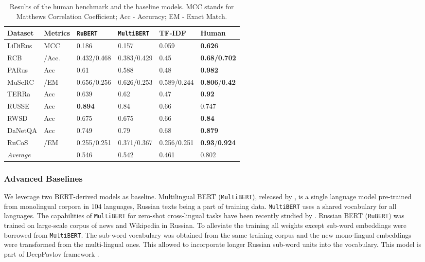 \documentclass[11pt,a4paper]{article}
\begin{document}
\begin{table*}[!htbp]
\centering
\begin{tabular}{|l|l|l|l|l|l|}
\hline
\textbf{Dataset}   & \textbf{Metrics} & \texttt{RuBERT}      & \texttt{MultiBERT}   & TF-IDF & Human                           \\  \hline
LiDiRus & MCC     & 0.186       & 0.157       & 0.059   & \textbf{0.626}                           \\ 
RCB     & /Acc. & 0.432/0.468 & 0.383/0.429 & 0.45   & \textbf{0.68/0.702  }                    \\ 
PARus   & Acc     & 0.61        & 0.588       & 0.48   & \textbf{0.982}                           \\ 
MuSeRC  & /EM  & 0.656/0.256 & 0.626/0.253 & 0.589/0.244      & \textbf{0.806}/\textbf{0.42 }                     \\ 
TERRa   & Acc     & 0.639       & 0.62        & 0.47   & \textbf{0.92}                            \\ 
RUSSE   & Acc     & \textbf{0.894}       & 0.84        & 0.66   & 0.747                           \\ 
RWSD    & Acc     & 0.675       & 0.675       & 0.66   & \textbf{0.84 }                           \\ 
DaNetQA & Acc     & 0.749       & 0.79        & 0.68   & \textbf{0.879}                           \\ 
RuCoS   & /EM   & 0.255/0.251 & 0.371/0.367 & 0.256/0.251   & \textbf{0.93}/\textbf{0.924} \\ \hline
\textit{Average}   &         & 0.546           & 0.542       & 0.461      & 0.802                               \\ \hline
\end{tabular}
\caption{Results of the human benchmark and the baseline models. MCC stands for Matthews Correlation Coefficient; Acc - Accuracy; EM - Exact Match.}
\label{table:results}
\end{table*}


\subsubsection{Advanced Baselines} \label{sec:advanced-baseline}

We leverage two BERT-derived models as baseline. Multilingual BERT (\texttt{MultiBERT}), released by \cite{devlin2019bert}, is a single language model pre-trained from monolingual corpora in 104 languages, Russian texts being a part of training data. \texttt{MultiBERT} uses a shared vocabulary for all languages. The capabilities of \texttt{MultiBERT} for  zero-shot cross-lingual tasks have been recently studied by \cite{pires2019multilingual}. Russian BERT (\texttt{RuBERT}) was trained on large-scale corpus of news and Wikipedia in Russian. To alleviate the training all weights except sub-word embeddings were borrowed from \texttt{MultiBERT}. The sub-word vocabulary was obtained from the same training corpus and the new mono-lingual embeddings were transformed from the multi-lingual ones. This allowed to incorporate longer Russian sub-word units into the vocabulary. This model is  part of DeepPavlov framework \cite{kuratov2019adaptation}. 
\end{document}
